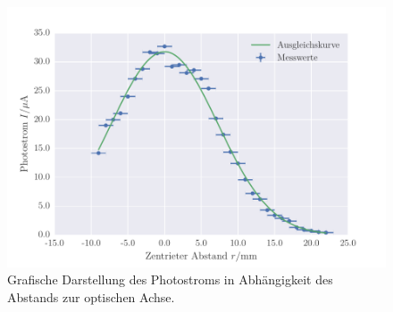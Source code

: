 \begin{figure}[!h]
 \centering
 \includegraphics[scale=0.75]{../Grafiken/TEM_00.pdf}
 \caption{Grafische Darstellung des Photostroms in Abhängigkeit des Abstands zur optischen Achse.\label{fig:tem_00}}
 \end{figure} 